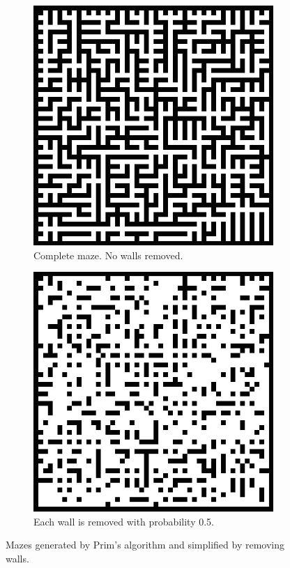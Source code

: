 \documentclass{article}
\begin{document}
\begin{figure}[H]
    \centering
    \begin{subfigure}[b]{0.3\textwidth}
        \includegraphics[width=\textwidth]{maze_easyfy_1.png}
        \caption{Complete maze. No walls removed.}
    \end{subfigure}
    \quad \quad
    \begin{subfigure}[b]{0.3\textwidth}
        \includegraphics[width=\textwidth]{maze_easyfy_05.png}
        \caption{Each wall is removed with probability 0.5.}
    \end{subfigure}
    \caption{Mazes generated by Prim's algorithm and simplified by removing
    walls.}
\end{figure}
\end{document}
